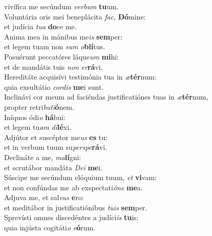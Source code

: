 \oddverse vivífica me secúndum \textit{ver}\textit{bum} \textbf{tu}um.\\
\evenverse Voluntária oris mei beneplácita \textit{fac}, \textbf{Dó}mine:~\*\\
\evenverse et judícia \textit{tu}\textit{a} \textbf{do}ce me.\\
\oddverse Anima mea in mánibus me\textit{is} \textbf{sem}per:~\*\\
\oddverse et legem tuam non \textit{sum} \textit{o}\textbf{blí}tus.\\
\evenverse Posuérunt peccatóres láque\textit{um} \textbf{mi}hi:~\*\\
\evenverse et de mandátis tuis \textit{non} \textit{er}\textbf{rá}vi.\\
\oddverse Hereditáte acquisívi testimónia tua in \textit{æ}\textbf{tér}num:~\*\\
\oddverse quia exsultátio \textit{cor}\textit{dis} \textbf{me}i sunt.\\
\evenverse Inclinávi cor meum ad faciéndas justificatiónes tuas in \textit{æ}\textbf{tér}num,~\*\\
\evenverse propter retri\textit{bu}\textit{ti}\textbf{ó}nem.\\
\oddverse Iníquos ódi\textit{o} \textbf{há}bui:~\*\\
\oddverse et legem tu\textit{am} \textit{di}\textbf{lé}xi.\\
\evenverse Adjútor et suscéptor me\textit{us} \textbf{es} tu:~\*\\
\evenverse et in verbum tuum su\textit{per}\textit{spe}\textbf{rá}vi.\\
\oddverse Declináte a me, \textit{ma}\textbf{lí}gni:~\*\\
\oddverse et scrutábor mandáta \textit{De}\textit{i} \textbf{me}i.\\
\evenverse Súscipe me secúndum elóquium tuum, \textit{et} \textbf{vi}vam:~\*\\
\evenverse et non confúndas me ab exspectati\textit{ó}\textit{ne} \textbf{me}a.\\
\oddverse Adjuva me, et sal\textit{vus} \textbf{e}ro:~\*\\
\oddverse et meditábor in justificatiónibus \textit{tu}\textit{is} \textbf{sem}per.\\
\evenverse Sprevísti omnes discedéntes a judíci\textit{is} \textbf{tu}is:~\*\\
\evenverse quia injústa cogitáti\textit{o} \textit{e}\textbf{ó}rum.\\
